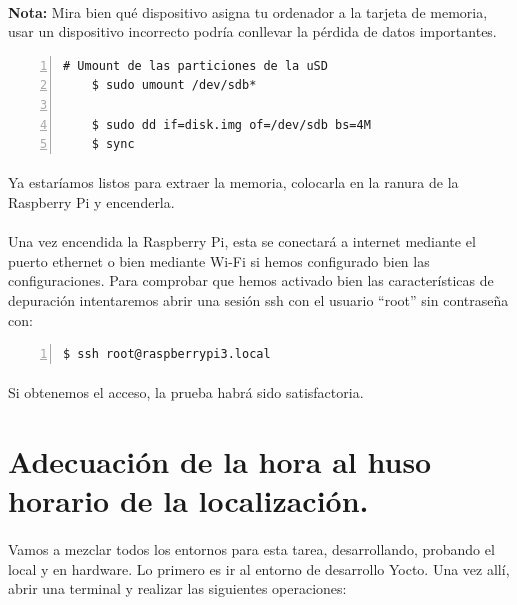 \paragraph{}\textbf{Nota:} Mira bien qué dispositivo asigna tu ordenador a la tarjeta
de memoria, usar un dispositivo incorrecto podría conllevar la pérdida de datos
importantes.

\begin{lstlisting}[style=consola, numbers=left]
    # Umount de las particiones de la uSD
    $ sudo umount /dev/sdb*

    $ sudo dd if=disk.img of=/dev/sdb bs=4M
    $ sync
\end{lstlisting}

\paragraph{}Ya estaríamos listos para extraer la memoria, colocarla en la ranura de
la Raspberry Pi y encenderla.

\paragraph{}Una vez encendida la Raspberry Pi, esta se conectará a internet mediante
el puerto ethernet o bien mediante Wi-Fi si hemos configurado bien las configuraciones.
Para comprobar que hemos activado bien las características de depuración intentaremos
abrir una sesión ssh con el usuario ``root'' sin contraseña con:

\begin{lstlisting}[style=consola, numbers=left]
    $ ssh root@raspberrypi3.local
\end{lstlisting}

\paragraph{}Si obtenemos el acceso, la prueba habrá sido satisfactoria.

\section{Adecuación de la hora al huso horario de la localización.}

\paragraph{}Vamos a mezclar todos los entornos para esta tarea, desarrollando, probando
el local y en hardware. Lo primero es ir al entorno de desarrollo Yocto. Una vez allí,
abrir una terminal y realizar las siguientes operaciones:

